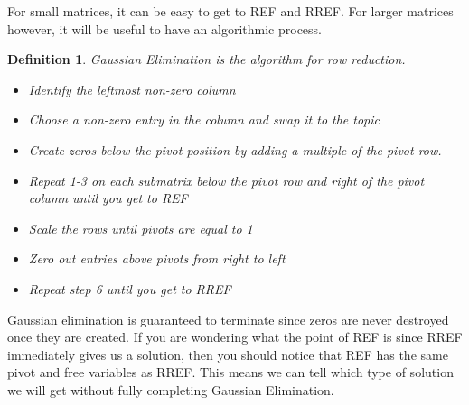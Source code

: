 \documentclass{article}
\newtheorem{definition}{Definition}
\begin{document}
    For small matrices, it can be easy to get to REF and RREF. For larger matrices however, it will be useful to have an algorithmic process.
    \begin{definition}
        Gaussian Elimination is the algorithm for row reduction.
        \begin{itemize}
            \item[1] Identify the leftmost non-zero column
            \item[2] Choose a non-zero entry in the column and swap it to the topic
            \item[3] Create zeros below the pivot position by adding a multiple of the pivot row.
            \item[4] Repeat 1-3 on each submatrix below the pivot row and right of the pivot column until you get to REF
            \item[5] Scale the rows until pivots are equal to 1
            \item[6] Zero out entries above pivots from right to left
            \item[7] Repeat step 6 until you get to RREF      
        \end{itemize}
    \end{definition}
    Gaussian elimination is guaranteed to terminate since zeros are never destroyed once they are created. If you are wondering what the point of REF is since RREF immediately gives us a solution, then you should notice that REF has the same pivot and free variables as RREF.
    This means we can tell which type of solution we will get without fully completing Gaussian Elimination.
\end{document}
